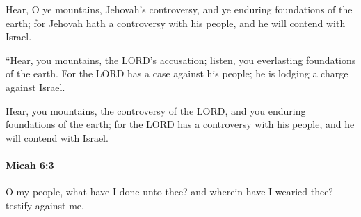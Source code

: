 			\begin{versebox}
					\item[BHS] 
					\item[LXX] 
					\item[ASV] Hear, O ye mountains, Jehovah's controversy, and ye enduring foundations of the earth; for Jehovah hath a controversy with his people, and he will contend with Israel.
					\item[NIV] “Hear, you mountains, the LORD’s accusation; listen, you everlasting foundations of the earth. For the LORD has a case against his people; he is lodging a charge against Israel.
					\item[NRSV] Hear, you mountains, the controversy of the LORD, and you enduring foundations of the earth; for the LORD has a controversy with his people, and he will contend with Israel.
			\end{versebox}

		\paragraph{Micah 6:3} %
			\label{MICAH-6-3}

			O my people, what have I done unto thee? and wherein have I wearied thee? testify against me.

